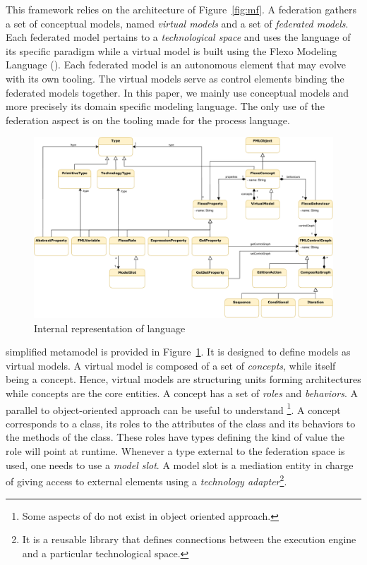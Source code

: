 This framework relies on the architecture of Figure~\ref{fig:mf}. A federation
gathers a set of conceptual models, named \emph{virtual models} and a
set of \emph{federated models}. Each federated model pertains to a
\emph{technological space} and uses the language of its specific
paradigm while a virtual model is built using the Flexo Modeling
Language (\FML). Each federated model is an autonomous
element that may evolve with its own tooling. The virtual models
serve as control elements binding the federated models together.
In this paper, we mainly use conceptual models and more precisely \FML its domain specific modeling language. The only use of the federation aspect is on the tooling made for the process language.

\begin{figure}[t]
    \centering
    \includegraphics[width=\columnwidth]{Figures/FMLMetaModel.pdf}
    \caption{Internal representation of \FML language}
    \label{fig:mm}
\end{figure}

\FML simplified metamodel is provided in Figure~\ref{fig:mm}. It is designed to define models as virtual models. A virtual model
is composed of a set of \emph{concepts}, while itself being a concept.
Hence, virtual models are structuring units forming architectures while concepts are the
core entities. A concept has a set of \emph{roles} and
\emph{behaviors}. A parallel to object-oriented approach can be useful
to understand \FML\footnote{Some aspects of \FML do not exist in object oriented approach.}. A concept corresponds to a class, its roles to the
attributes of the class and its behaviors to the methods of the class.
These roles have types defining the kind of value the role will point
at runtime.
Whenever a type external to the federation space is used, one needs to use a \emph{model slot}. A model
slot is a mediation entity in charge of giving
access to external elements using
a \emph{technology adapter}\footnote{It is a reusable library that defines
connections between the \FML execution engine and a particular
technological space.}.

